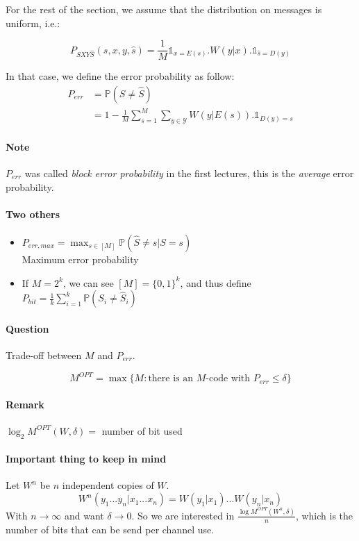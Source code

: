 For the rest of the section, we assume that the distribution on messages is uniform, i.e.:

\[P_{SXY\hat{S}}(s,x,y,\hat{s})= \frac{1}{M} \mathbb{1}_{x=E(s)}.W(y|x).\mathbb{1}_{\hat{s}=D(y)}\]

\begin{defi}
In that case, we define the error probability as follow:
\begin{align*}
P_{err} &= \mathbb{P}(S\neq\hat{S})\\
& = 1 - \frac{1}{M}\sum_{s=1}^M \sum_{y\in \mathcal{Y}} W(y|E(s)).\mathbb{1}_{D(y)=s}
\end{align*}
\end{defi}

\paragraph{Note} $P_{err}$ was called \emph{block error probability} in the first lectures, this is the \emph{average} error probability.

\paragraph{Two others}
\begin{itemize}
\item $P_{err,max}=\max_{s\in[M]} \mathbb{P}(\hat{S}\neq s|S=s)$\\
Maximum error probability
\item If $M=2^k$, we can see $[M]=\{0,1\}^k$, and thus define $P_{bit}=\frac{1}{k}\sum_{i=1}^{k}\mathbb{P}(S_i \neq \hat{S}_i)$
\end{itemize}

\paragraph{Question} Trade-off between $M$ and $P_{err}$.

\begin{defi}
\[M^{OPT}=\max \{ M: \text{there is an $M$-code with }P_{err} \leq \delta \}\]
\end{defi}

\paragraph{Remark} $\log_2 M^{OPT}(W,\delta)=$ number of bit used

\paragraph{Important thing to keep in mind} Let $W^n$ be $n$ independent copies of $W$.
\[W^n(y_1...y_n|x_1...x_n)=W(y_1|x_1)...W(y_n|x_n)\]
With $n\to \infty$ and want $\delta \to 0$. So we are interested in $\frac{\log M^{OPT}(W^n,\delta)}{n}$, which is the number of bits that can be send per channel use.

